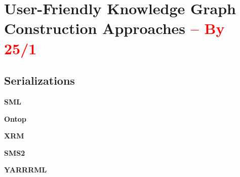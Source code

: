 \section{User-Friendly Knowledge Graph Construction Approaches \textcolor{red}{-- By 25/1}}
\label{sec:chp2_easy_kgc}


\subsection{Serializations}

\noindent\textbf{SML}~\parencite{Stadler2015sml}

\noindent\textbf{Ontop}~\parencite{rodriguez2015efficient}

\noindent\textbf{XRM}~\parencite{xrm}

\noindent\textbf{SMS2}~\parencite{sms2}

\noindent\textbf{YARRRML}~\parencite{Heyvaert2018yarrrml}

